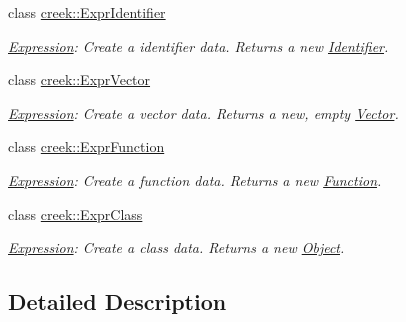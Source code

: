 \begin{DoxyCompactItemize}
class \hyperlink{classcreek_1_1_expr_identifier}{creek\+::\+Expr\+Identifier}
\begin{DoxyCompactList}\small\item\em \hyperlink{classcreek_1_1_expression}{Expression}\+: Create a identifier data. Returns a new {\ttfamily \hyperlink{classcreek_1_1_identifier}{Identifier}}. \end{DoxyCompactList}\item 
class \hyperlink{classcreek_1_1_expr_vector}{creek\+::\+Expr\+Vector}
\begin{DoxyCompactList}\small\item\em \hyperlink{classcreek_1_1_expression}{Expression}\+: Create a vector data. Returns a new, empty {\ttfamily \hyperlink{classcreek_1_1_vector}{Vector}}. \end{DoxyCompactList}\item 
class \hyperlink{classcreek_1_1_expr_function}{creek\+::\+Expr\+Function}
\begin{DoxyCompactList}\small\item\em \hyperlink{classcreek_1_1_expression}{Expression}\+: Create a function data. Returns a new {\ttfamily \hyperlink{classcreek_1_1_function}{Function}}. \end{DoxyCompactList}\item 
class \hyperlink{classcreek_1_1_expr_class}{creek\+::\+Expr\+Class}
\begin{DoxyCompactList}\small\item\em \hyperlink{classcreek_1_1_expression}{Expression}\+: Create a class data. Returns a new {\ttfamily \hyperlink{classcreek_1_1_object}{Object}}. \end{DoxyCompactList}\end{DoxyCompactItemize}


\subsection{Detailed Description}
